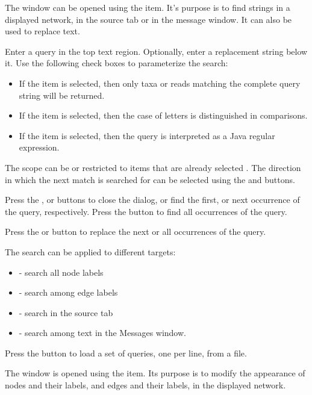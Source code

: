\documentclass[11pt]{article}
\begin{document}
The  window can be opened using the
 item. It's purpose is to find strings in
a displayed network, in the source tab or in the message window.
It can also be used to replace text.

Enter a query in the top text region. Optionally, enter a replacement string
below it.
Use the following check boxes to parameterize the search:
\begin{itemize}
\item If the  item is selected, then only taxa or reads
matching the complete query string will be returned.
\item If the  item is selected, then the case of
letters is distinguished in comparisons.
\item If the  item is selected, then
the query is interpreted as a Java regular expression.
\end{itemize}

The scope can be  or restricted to items that are already
selected .
The direction in which the next match is searched for can be selected using the
 and  buttons.

Press the ,  or 
buttons to close the dialog, or find the first, or next occurrence
of the query, respectively.
Press the  button to find all occurrences of the query.

Press the  or  button to replace the next or
all occurrences of the query.


The search can be applied to different targets:
\begin{itemize}
\item {} - search all node labels
\item {} - search among edge labels
\item {} - search in the source tab
\item {} - search among text in the Messages window.
\end{itemize}

Press the  button to load a set of queries, one per line, from a file.


The  window is opened using the
 item.
Its purpose is to modify the appearance of nodes and their labels,
and edges and their labels, in the displayed network.
\end{document}
